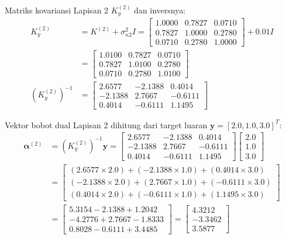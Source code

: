 \documentclass[11pt,a4paper]{article}
\begin{document}
Matriks kovariansi Lapisan 2 $K_y^{(2)}$ dan inversnya:
\begin{align}
K_y^{(2)} &= K^{(2)} + \sigma_{n2}^2 I = \begin{bmatrix} 1.0000 & 0.7827 & 0.0710 \\ 0.7827 & 1.0000 & 0.2780 \\ 0.0710 & 0.2780 & 1.0000 \end{bmatrix} + 0.01 I \nonumber \\
&= \begin{bmatrix} 1.0100 & 0.7827 & 0.0710 \\ 0.7827 & 1.0100 & 0.2780 \\ 0.0710 & 0.2780 & 1.0100 \end{bmatrix} \\
(K_y^{(2)})^{-1} &= \begin{bmatrix} 2.6577 & -2.1388 & 0.4014 \\ -2.1388 & 2.7667 & -0.6111 \\ 0.4014 & -0.6111 & 1.1495 \end{bmatrix}
\end{align}

Vektor bobot dual Lapisan 2 dihitung dari target luaran $\mathbf{y} = [2.0, 1.0, 3.0]^T$:
\begin{align}
\boldsymbol{\alpha}^{(2)} &= (K_y^{(2)})^{-1} \mathbf{y} = \begin{bmatrix} 2.6577 & -2.1388 & 0.4014 \\ -2.1388 & 2.7667 & -0.6111 \\ 0.4014 & -0.6111 & 1.1495 \end{bmatrix} \begin{bmatrix} 2.0 \\ 1.0 \\ 3.0 \end{bmatrix} \nonumber \\
&= \begin{bmatrix} (2.6577 \times 2.0) + (-2.1388 \times 1.0) + (0.4014 \times 3.0) \\ (-2.1388 \times 2.0) + (2.7667 \times 1.0) + (-0.6111 \times 3.0) \\ (0.4014 \times 2.0) + (-0.6111 \times 1.0) + (1.1495 \times 3.0) \end{bmatrix} \nonumber \\
&= \begin{bmatrix} 5.3154 - 2.1388 + 1.2042 \\ -4.2776 + 2.7667 - 1.8333 \\ 0.8028 - 0.6111 + 3.4485 \end{bmatrix} = \begin{bmatrix} \mathbf{4.3212} \\ \mathbf{-3.3462} \\ \mathbf{3.5877} \end{bmatrix}
\end{align}
\end{document}
